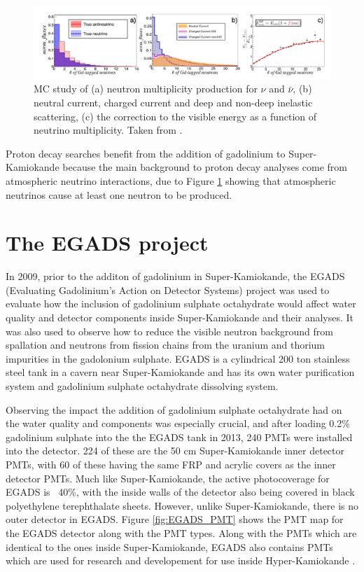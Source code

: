 \begin{figure}[H]
    \includegraphics[width=\textwidth]{Figures/atm_recon_energy.png}
\caption{MC study of (a) neutron multiplicity production for $\nu$ and ${\bar{\nu}}$, (b) neutral current, charged current and deep and non-deep inelastic scattering, (c) the correction to the visible energy as a function of neutrino multiplicity. Taken from \cite{martiEvaluationGadoliniumAction2020}.}
\label{fig:atm_nu_energy}
\end{figure}


Proton decay searches benefit from the addition of gadolinium to Super-Kamiokande because the main background to proton decay analyses come from atmospheric neutrino interactions, due to Figure \ref{fig:atm_nu_energy} showing that atmospheric neutrinos cause at least one neutron to be produced. 

\section{The EGADS project}

In 2009, prior to the additon of gadolinium in Super-Kamiokande, the EGADS (Evaluating Gadolinium's Action on Detector Systems) project was used to evaluate how the inclusion of gadolinium sulphate octahydrate would affect water quality and detector components inside Super-Kamiokande and their analyses. It was also used to observe how to reduce the visible neutron background from spallation and neutrons from fission chains from the uranium and thorium impurities in the gadolonium sulphate. EGADS is a cylindrical 200 ton stainless steel tank in a cavern near Super-Kamiokande and has its own water purification system and gadolinium sulphate octahydrate dissolving system. 

Observing the impact the addition of gadolinium sulphate octahydrate had on the water quality and components was especially crucial, and after loading 0.2\% gadolinium sulphate into the the EGADS tank in 2013, 240 PMTs were installed into the detector. 224 of these are the 50 cm Super-Kamiokande inner detector PMTs, with 60 of these having the same FRP and acrylic covers as the inner detector PMTs. Much like Super-Kamiokande, the active photocoverage for EGADS is ~40\%, with the inside walls of the detector also being covered in black polyethylene terephthalate sheets. However, unlike Super-Kamiokande, there is no outer detector in EGADS. Figure \ref{fig:EGADS_PMT} shows the PMT map for the EGADS detector along with the PMT types. Along with the PMTs which are identical to the ones inside Super-Kamiokande, EGADS also contains PMTs which are used for research and developement for use inside Hyper-Kamiokande \cite{martiEvaluationGadoliniumAction2020}.

